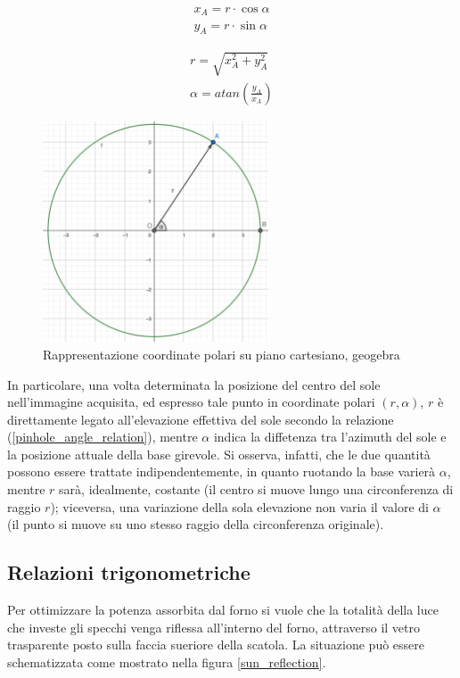 \documentclass[12pt]{article}
\begin{document}
    \begin{equation}
        \begin{split}
        x_A = r \cdot \cos\alpha \\
        y_A = r \cdot  \sin\alpha
        \end{split}
    \end{equation}
    
    \begin{equation}
        \begin{split}
        r = \sqrt{x_A^2 + y_A^2} \\
        \alpha = atan \left(\frac{y_A}{x_A} \right)
        \end{split}
    \end{equation}
    
    \begin{figure}[h]
    \centering
        \includegraphics[width=190pt]{Draws/geogebra-export_polar_circle.png}
        \caption{Rappresentazione coordinate polari su piano cartesiano, geogebra}
    \end{figure}
    
    In particolare, una volta determinata la posizione del centro del sole nell'immagine acquisita, ed espresso tale punto in coordinate polari $(r, \alpha)$, $r$ è direttamente legato all'elevazione effettiva del sole secondo la relazione (\ref{pinhole_angle_relation}), mentre $\alpha$ indica la diffetenza tra l'azimuth del sole e la posizione attuale della base girevole. Si osserva, infatti, che le due quantità possono essere trattate indipendentemente, in quanto ruotando la base varierà $\alpha$, mentre $r$ sarà, idealmente, costante (il centro si muove lungo una circonferenza di raggio $r$); viceversa, una variazione della sola elevazione non varia il valore di $\alpha$ (il punto si muove su uno stesso raggio della circonferenza originale).
    
    
    \subsection{Relazioni trigonometriche}
    Per ottimizzare la potenza assorbita dal forno si vuole che la totalità della luce che investe gli specchi venga riflessa all'interno del forno, attraverso il vetro trasparente posto sulla faccia sueriore della scatola. La situazione può essere schematizzata come mostrato nella figura \ref{sun_reflection}.
\end{document}

